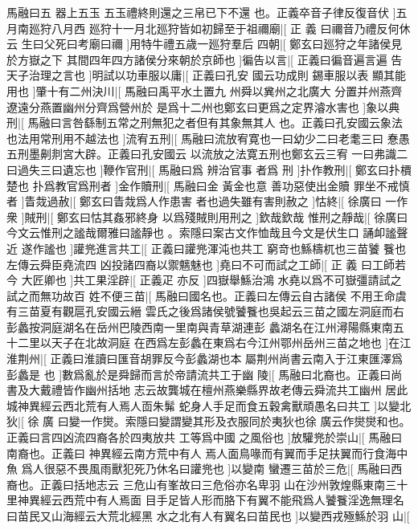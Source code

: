 馬融曰五%
器上五玉%
%
五玉禮終則還之三帛已下不還%
也。正義卒音子律反復音伏%
]五月南廵狩八月西%
%
廵狩十一月北廵狩皆如初歸至于祖禰廟|[%
正%
義%
%
曰禰音乃禮反何休云%
生曰父死曰考廟曰禰%
]用特牛禮五歳一廵狩羣后%
%
四朝|[%
鄭玄曰廵狩之年諸侯見於方嶽之下%
其間四年四方諸侯分來朝於京師也%
]徧告以言|[%
%
正義曰徧音遍言遍%
告天子治理之言也%
]明試以功車服以庸|[%
正義曰孔安%
國云功成則%
%
錫車服以表%
顯其能用也%
]肇十有二州決川|[%
馬融曰禹平水土置九%
州舜以兾州之北廣大%
%
分置并州燕齊遼遠分燕置幽州分齊爲營州於%
是爲十二州也鄭玄曰更爲之定界濬水害也%
]象以典%
%
刑|[%
馬融曰言咎繇制五常之刑無犯之者但有其象無其人%
也。正義曰孔安國云象法也法用常刑用不越法也%
%
]流宥五刑|[%
馬融曰流放宥寛也一曰幼少二曰老耄三曰%
惷愚五刑墨劓剕宮大辟。正義曰孔安國云%
%
以流放之法寛五刑也鄭玄云三宥%
一曰弗識二曰過失三曰遺忘也%
]鞭作官刑|[%
馬融曰爲%
辨治官事%
%
者爲%
刑%
]扑作教刑|[%
鄭玄曰扑檟楚也%
扑爲教官爲刑者%
]金作贖刑|[%
馬融曰金%
黃金也意%
%
善功惡使出金贖%
罪坐不戒慎者%
]眚烖過赦|[%
鄭玄曰眚烖爲人作患害%
者也過失雖有害則赦之%
%
]怙終|[%
徐廣曰%
一作衆%
]賊刑|[%
鄭玄曰怙其姦邪終身%
以爲殘賊則用刑之%
]欽哉欽哉%
%
惟刑之靜哉|[%
徐廣曰今文云惟刑之謐哉爾雅曰謐靜也%
。索隱曰案古文作恤哉且今文是伏生口%
%
誦卹謐聲近%
遂作謐也%
]讙兠進言共工|[%
正義曰讙兠渾沌也共工%
窮竒也鯀檮杌也三苗饕%
%
餮也左傳云舜臣堯流四%
凶投諸四裔以禦魑魅也%
]堯曰不可而試之工師|[%
正%
義%
%
曰工師若今%
大匠卿也%
]共工果淫辟|[%
正義疋%
亦反%
]四嶽舉鯀治鴻%
%
水堯以爲不可嶽彊請試之試之而無功故百%
%
姓不便三苗|[%
馬融曰國名也。正義曰左傳云自古諸侯%
不用王命虞有三苗夏有觀扈孔安國云縉%
%
雲氏之後爲諸侯號饕餮也吳起云三苗之國左洞庭而右%
彭蠡按洞庭湖名在岳州巴陵西南一里南與青草湖連彭%
%
蠡湖名在江州潯陽縣東南五十二里以天子在北故洞庭%
在西爲左彭蠡在東爲右今江州鄂州岳州三苗之地也%
%
]在江淮荆州|[%
正義曰淮讀曰匯音胡罪反今彭蠡湖也本%
屬荆州尚書云南入于江東匯澤爲彭蠡是%
%
也%
]數爲亂於是舜歸而言於帝請流共工于幽%
%
陵|[%
馬融曰北裔也。正義曰尚書及大戴禮皆作幽州括地%
志云故龔城在檀州燕樂縣界故老傳云舜流共工幽州%
%
居此城神異經云西北荒有人焉人靣朱髴%
蛇身人手足而食五穀禽獸頑愚名曰共工%
]以變北狄|[%
徐%
廣%
%
曰變一作爕。索隱曰變謂變其形及衣服同於夷狄也徐%
廣云作爕爕和也。正義曰言四凶流四裔各於四夷放共%
%
工等爲中國%
之風俗也%
]放驩兠於崇山|[%
馬融曰南裔也。正義曰%
神異經云南方荒中有人%
%
焉人面鳥喙而有翼而手足扶翼而行食海中魚%
爲人很惡不畏風雨獸犯死乃休名曰讙兠也%
]以變南%
%
蠻遷三苗於三危|[%
馬融曰西裔也。正義曰括地志云%
三危山有峯故曰三危俗亦名卑羽%
%
山在沙州敦煌縣東南三十里神異經云西荒中有人焉面%
目手足皆人形而胳下有翼不能飛爲人饕餮淫逸無理名%
%
曰苗民又山海經云大荒北經黑%
水之北有人有翼名曰苗民也%
]以變西戎殛鯀於羽%
%
山|[%
